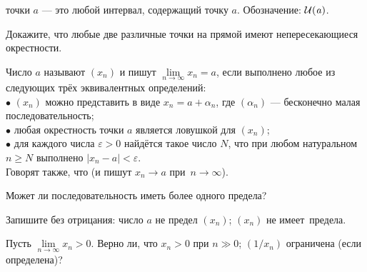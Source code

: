 \documentclass[a4paper,11pt]{article}
\begin{document}


 точки $a$ %
--- это %
любой интервал, содержащий точку $a$.
Обозначение: ${\cal U(\it a)}$. %

Докажите, что любые две различные точки на прямой имеют непересекающиеся
окрестности.

 \label{limit3} Число $a$ называют 
$(x_n)$ и пишут $\lim\limits_{n \to \infty} x_n = a$, если %
выполнено любое из следующих трёх эквивалентных определений:\\
$\bullet$ $(x_n)$ можно представить в виде
$x_n=a+\alpha_n$, где $(\alpha_n)$ --- бесконечно малая
последовательность;\\
$\bullet$ любая окрестность точки $a$ является ловушкой для $(x_n)$;\\
$\bullet$ для каждого числа $\varepsilon>0$ найд\"ется такое число $N$,
что при любом натуральном $n\geq N$ выполнено $|x_n-a|<\varepsilon$.\\
Говорят также, что 
(и пишут $x_n \to a$ при~\hbox{$n \to \infty$)}.

Может ли последовательность
иметь более одного предела?


Запишите %
без отрицания:
 число
$a$ не предел %
$(x_n)$;
$(x_n)$ не имеет~предела.


Пусть $\lim\limits_{n \to \infty}x_n>0$. %
Верно ли, что
 $\!\!x_n>0$ при $n\gg0$;
 $\!\!(1/x_n)$ ограничена (если определена)?
\end{document}
